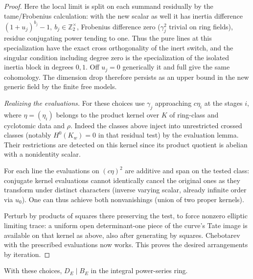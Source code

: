 \begin{proof}
Here the local limit is split on each summand residually by the tame/Frobenius
calculation: with the new scalar as well it has inertia difference
\((1+u_j)^{b_j}-1,\ b_j\in\mathbb Z_2^\times\), Frobenius difference zero
(\(\gamma_j^2\) trivial on ring fields), residue conjugating power tending to
one. Thus the pure lines at this specialization have the exact cross
orthogonality of the inert switch, and the singular condition including degree
zero is the specialization of the isolated inertia block in degrees \(0,1\).
Off \(u_j=0\) generically it and full give the same cohomology. The dimension
drop therefore persists as an upper bound in the new generic field by the
finite free models.

\par\smallskip
\emph{Realizing the evaluations.}  For these choices use \(\gamma_j\)
approaching \(c\eta_i\) at the stages \(i\), where \(\eta=(\eta_i)\) belongs
to the product kernel over \(K\) of ring-class and cyclotomic data and
\(\rho\). Indeed the classes above inject into unrestricted crossed classes
(notably \(H^0(K_w)=0\) in that residual test) by the evaluation lemma. Their
restrictions are detected on this kernel since its product quotient is abelian
with a nonidentity scalar.

For each line the evaluations on \((c\eta)^2\) are additive and span on the
tested class: conjugate kernel evaluations cannot identically cancel the
original ones as they transform under distinct characters (inverse varying
scalar, already infinite order via \(u_0\)). One can thus achieve both
nonvanishings (union of two proper kernels).

Perturb by products of squares there preserving the test, to force nonzero
elliptic limiting trace: a uniform open determinant-one piece of the curve's
Tate image is available on that kernel as above, also after generating by
squares. Chebotarev with the prescribed evaluations now works. This proves the
desired arrangements by iteration.
\end{proof}

\begin{lemma}\label{cyclic:divisibility}
With these choices, \(D_E\mid B_E\) in the integral power-series ring.
\end{lemma}

